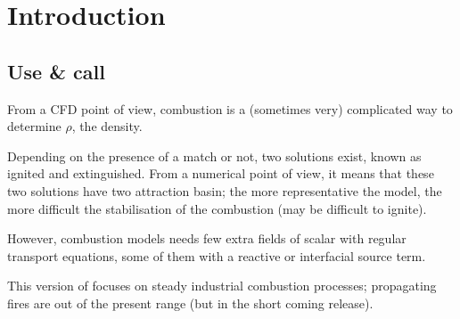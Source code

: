 
%
%
%
%


\section{Introduction}\label{sec:combbase}

\subsection{Use \& call}


From a CFD point of view, combustion is a (sometimes very) complicated way to
determine $\rho$, the density.

Depending on the presence of a match or not, two solutions exist, known as
ignited and extinguished. From a numerical point of view, it means that these
two solutions have two attraction basin; the more representative the model, the more difficult the stabilisation of the combustion (may be difficult to
ignite). 

However, combustion models needs few extra fields of scalar with regular
transport equations, some of them with a reactive or interfacial source term.

This version of \CS focuses on steady industrial combustion processes;
propagating fires are out of the present range (but  in the short coming release). 

